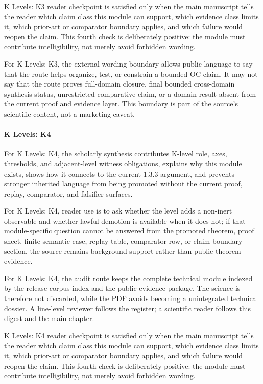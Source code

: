 K Levels: K3 reader checkpoint is satisfied only when the main manuscript tells the reader which claim class this module can support, which evidence class limits it, which prior-art or comparator boundary applies, and which failure would reopen the claim. This fourth check is deliberately positive: the module must contribute intelligibility, not merely avoid forbidden wording.


For K Levels: K3, the external wording boundary allows public language to say that the route helps organize, test, or constrain a bounded OC claim. It may not say that the route proves full-domain closure, final bounded cross-domain synthesis status, unrestricted comparative claim, or a domain result absent from the current proof and evidence layer. This boundary is part of the source's scientific content, not a marketing caveat.


\paragraph{K Levels: K4}

For K Levels: K4, the scholarly synthesis contributes K-level role, axes, thresholds, and adjacent-level witness obligations, explains why this module exists, shows how it connects to the current 1.3.3 argument, and prevents stronger inherited language from being promoted without the current proof, replay, comparator, and falsifier surfaces.


For K Levels: K4, reader use is to ask whether the level adds a non-inert observable and whether lawful demotion is available when it does not; if that module-specific question cannot be answered from the promoted theorem, proof sheet, finite semantic case, replay table, comparator row, or claim-boundary section, the source remains background support rather than public theorem evidence.


For K Levels: K4, the audit route keeps the complete technical module indexed by the release corpus index and the public evidence package. The science is therefore not discarded, while the PDF avoids becoming a unintegrated technical dossier. A line-level reviewer follows the register; a scientific reader follows this digest and the main chapter.


K Levels: K4 reader checkpoint is satisfied only when the main manuscript tells the reader which claim class this module can support, which evidence class limits it, which prior-art or comparator boundary applies, and which failure would reopen the claim. This fourth check is deliberately positive: the module must contribute intelligibility, not merely avoid forbidden wording.


